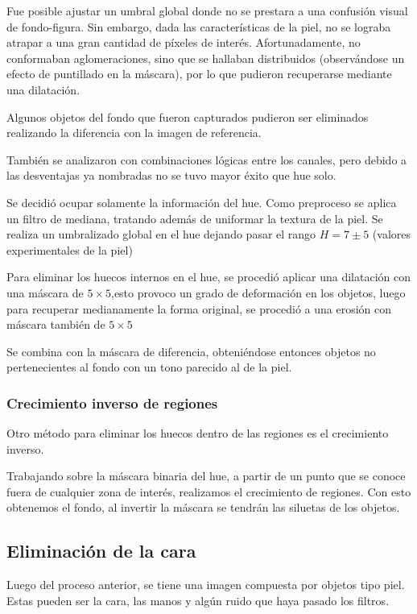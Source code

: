 \documentclass[portrait,a0paper,fontscale=0.277]{baposter}
\begin{document}
\begin{poster}
{		Fue posible ajustar un umbral global donde no se prestara a una confusión visual de fondo-figura.
		Sin embargo, dada las características de la piel, no se lograba atrapar a una gran cantidad de píxeles de interés. 
Afortunadamente, no conformaban aglomeraciones, sino que se hallaban distribuidos (observándose un efecto de puntillado en la máscara), 
por lo que pudieron recuperarse mediante una dilatación.

Algunos objetos del fondo que fueron capturados pudieron ser eliminados realizando la diferencia con la imagen de referencia. 
   		 
   		 También se analizaron con combinaciones lógicas entre los canales, pero debido a las desventajas ya nombradas
   		 no se tuvo mayor éxito que hue solo.

		Se decidió ocupar solamente la información del hue.
		Como preproceso se aplica un filtro de mediana, tratando además de uniformar la textura de la piel.
   		 Se realiza un umbralizado global en el hue dejando pasar el rango $H = 7 \pm 5$ (valores experimentales de la piel)

   		 Para eliminar los huecos internos en el hue, se procedió aplicar una dilatación con una máscara de $5 \times 5$,esto provoco un grado de deformación
   		 en los objetos, luego para recuperar medianamente la forma original, se procedió a una erosión con máscara también de $5 \times 5$

   		 Se combina con la máscara de diferencia, obteniéndose entonces
   		 objetos no pertenecientes al fondo con un tono parecido al de la piel.

   		 \subsubsection{Crecimiento inverso de regiones}
			Otro método para eliminar los huecos dentro de las regiones es el crecimiento inverso.
   	
			Trabajando sobre la máscara binaria del hue,		 
   			 a partir de un punto que se conoce fuera de cualquier zona de interés,
			realizamos el crecimiento de regiones. Con esto obtenemos el fondo, 
			al invertir la máscara se tendrán las siluetas de los objetos.


    \subsection{Eliminación de la cara}
   		 Luego del proceso anterior, se tiene una imagen compuesta por objetos
   	 tipo piel. Estas pueden ser la cara, las manos y algún ruido que haya pasado los filtros.

}
\end{poster}
\end{document}
